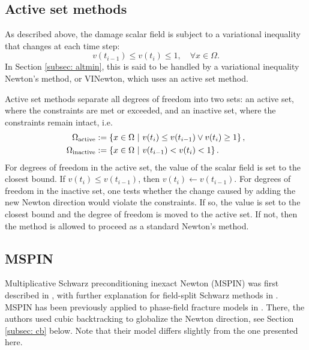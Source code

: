 \documentclass{article}
\numberwithin{equation}{section}
\begin{document}
\subsection{Active set methods}
\label{subsec: as}

As described above, the damage scalar field is subject to a variational inequality that changes at each time step:
\begin{equation*}
	v(t_{i-1}) \leq v(t_i) \leq 1, \quad \forall x \in \Omega.
\end{equation*}
In Section \ref{subsec: altmin}, this is said to be handled by a variational inequality Newton's method, or VINewton, which uses an active set method.

Active set methods separate all degrees of freedom into two sets: an active set, where the constraints are met or exceeded, and an inactive set, where the constraints remain intact, i.e.
\begin{align*}
	\Omega_{\text{active}} & := \left \{ x \in \Omega \ \middle \vert \ v(t_i) \leq v(t_{i-1}) \lor v(t_i) \geq 1 \right \},
	\\ \Omega_{\text{inactive}} & := \left \{ x \in \Omega \ \middle \vert \ v(t_{i-1}) < v(t_i) < 1 \right \}.
\end{align*}
For degrees of freedom in the active set, the value of the scalar field is set to the closest bound.
If $v(t_i) \leq v(t_{i-1})$, then $v(t_i) \gets v(t_{i-1})$.
For degrees of freedom in the inactive set, one tests whether the change caused by adding the new Newton direction would violate the constraints.
If so, the value is set to the closest bound and the degree of freedom is moved to the active set.
If not, then the method is allowed to proceed as a standard Newton's method.

\subsection{MSPIN}
\label{subsec: mspin}

Multiplicative Schwarz preconditioning inexact Newton (MSPIN) was first described in \cite{cai}, with further explanation for field-split Schwarz methods in \cite{liu}.
MSPIN has been previously applied to phase-field fracture models in \cite{3k}.
There, the authors used cubic backtracking to globalize the Newton direction, see Section \ref{subsec: cb} below.
Note that their model differs slightly from the one presented here.
\end{document}
